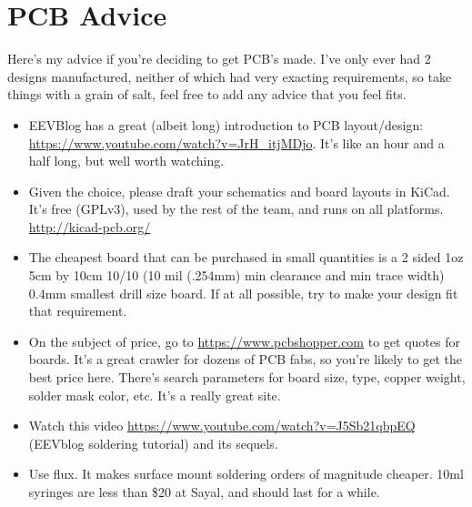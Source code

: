 \documentclass{article}
\begin{document}
\section{PCB Advice}
Here's my advice if you're deciding to get PCB's made. I've only ever had 2 designs manufactured, neither of which had very exacting requirements, so take things with a grain of salt, feel free to add any advice that you feel fits.
\begin{itemize}
\item EEVBlog has a great (albeit long) introduction to PCB layout/design: \url{https://www.youtube.com/watch?v=JrH_itjMDjo}. It's like an hour and a half long, but well worth watching.
\item Given the choice, please draft your schematics and board layouts in KiCad. It's free (GPLv3), used by the rest of the team, and runs on all platforms. \url{http://kicad-pcb.org/}
\item The cheapest board that can be purchased in small quantities is a 2 sided 1oz 5cm by 10cm 10/10 (10 mil (.254mm) min clearance and min trace width) 0.4mm smallest drill size board. If at all possible, try to make your design fit that requirement.
\item On the subject of price, go to \url{https://www.pcbshopper.com} to get quotes for boards. It's a great crawler for dozens of PCB fabs, so you're likely to get the best price here. There's search parameters for board size, type, copper weight, solder mask color, etc. It's a really great site.
\item Watch this video \url{https://www.youtube.com/watch?v=J5Sb21qbpEQ} (EEVblog soldering tutorial) and its sequels.
\item Use flux. It makes surface mount soldering orders of magnitude cheaper. 10ml syringes are less than \$20 at Sayal, and should last for a while.
\end{itemize}
\end{document}
